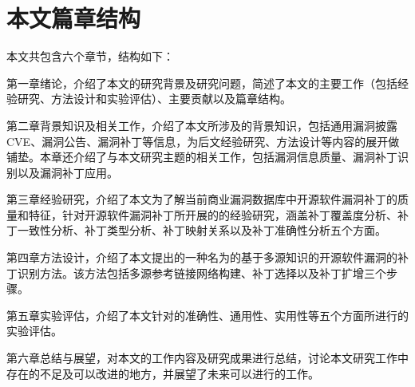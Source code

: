 \section{本文篇章结构}
本文共包含六个章节，结构如下：

第一章绪论，介绍了本文的研究背景及研究问题，简述了本文的主要工作（包括经验研究、方法设计和实验评估）、主要贡献以及篇章结构。

第二章背景知识及相关工作，介绍了本文所涉及的背景知识，包括通用漏洞披露CVE、漏洞公告、漏洞补丁等信息，为后文经验研究、方法设计等内容的展开做铺垫。本章还介绍了与本文研究主题的相关工作，包括漏洞信息质量、漏洞补丁识别以及漏洞补丁应用。

第三章经验研究，介绍了本文为了解当前商业漏洞数据库中开源软件漏洞补丁的质量和特征，针对开源软件漏洞补丁所开展的的经验研究，涵盖补丁覆盖度分析、补丁一致性分析、补丁类型分析、补丁映射关系以及补丁准确性分析五个方面。

第四章\tool 方法设计，介绍了本文提出的一种名为\tool 的基于多源知识的开源软件漏洞的补丁识别方法。该方法包括多源参考链接网络构建、补丁选择以及补丁扩增三个步骤。

第五章实验评估，介绍了本文针对\tool 的准确性、通用性、实用性等五个方面所进行的实验评估。

第六章总结与展望，对本文的工作内容及研究成果进行总结，讨论本文研究工作中存在的不足及可以改进的地方，并展望了未来可以进行的工作。
